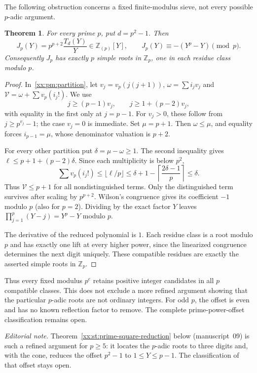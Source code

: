 \documentclass[11pt,a4paper]{article}
\numberwithin{equation}{section}
\newtheorem{theorem}{Theorem}[section]
\theoremstyle{definition}
\theoremstyle{remark}
\theoremstyle{plain}
\newcommand{\Z}{\mathbb Z}
\begin{document}
The following obstruction concerns a fixed finite-modulus sieve, not every
possible $p$-adic argument.
\begin{theorem}\label{xx:pm:square}
For every prime $p$, put $d=p^2-1$. Then
\[
 J_p(Y)=p^{p+2}\frac{T_d(Y)}Y\in\Z_{(p)}[Y],\qquad
 J_p(Y)\equiv-(Y^p-Y)\pmod p.
\]
Consequently $J_p$ has exactly $p$ simple roots in $\Z_p$, one in each residue
class modulo $p$.
\end{theorem}
\begin{proof}
In~\eqref{xx:pm:partition}, let $v_j=v_p(j(j+1))$, $\omega=\sum i_jv_j$ and
$\mathcal V=\omega+\sum v_p(i_j!)$. We use
\[
 j\ge(p-1)v_j,\qquad j\ge1+(p-2)v_j,
\]
with equality in the first only at $j=p-1$. For $v_j>0$, these follow from
$j\ge p^{v_j}-1$; the case $v_j=0$ is immediate. Set $\mu=p+1$. Then
$\omega\le\mu$, and equality forces $i_{p-1}=\mu$, whose denominator valuation
is $p+2$.

For every other partition put $\delta=\mu-\omega\ge1$. The second inequality
gives $\ell\le p+1+(p-2)\delta$. Since each multiplicity is below $p^2$,
\[
 \sum v_p(i_j!)\le\lfloor\ell/p\rfloor
 \le\delta+1-\left\lceil\frac{2\delta-1}p\right\rceil\le\delta.
\]
Thus $\mathcal V\le p+1$ for all nondistinguished terms. Only the distinguished
term survives after scaling by $p^{p+2}$. Wilson's congruence gives its
coefficient $-1$ modulo $p$ (also for $p=2$). Dividing by the exact factor $Y$
leaves $\prod_{j=1}^p(Y-j)=Y^p-Y$ modulo $p$.

The derivative of the reduced polynomial is $1$. Each residue class is a root
modulo $p$ and has exactly one lift at every higher power, since the linearized
congruence determines the next digit uniquely. These compatible residues are
exactly the asserted simple roots in $\Z_p$.
\end{proof}

Thus every fixed modulus $p^e$ retains positive integer candidates in all $p$
compatible classes. This does not exclude a more refined argument showing that
the particular $p$-adic roots are not ordinary integers. For odd $p$, the
offset is even and has no known reflection factor to remove. The complete
prime-power-offset classification remains open.

\emph{Editorial note.}  Theorem~\ref{xx:st:prime-square-reduction} below
(manuscript~09) is such a refined argument for $p\ge5$: it locates the
$p$-adic roots to three digits and, with the cone, reduces the offset $p^2-1$
to $1\le Y\le p-1$.  The classification of that offset stays open.
\end{document}
